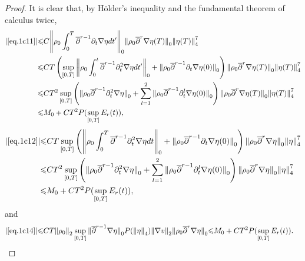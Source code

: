 \documentclass[12pt,twoside,reqno]{amsart}
\numberwithin{equation}{section}
\theoremstyle{definition}
\theoremstyle{remark}
\begin{document}
\begin{proof}
It is clear that, by H\"older's inequality and the fundamental theorem of calculus twice,
\begin{align*}
 {\vert{\eqref{eq.1c11}}\vert}{\leqslant}& C {\left\Vert{{\rho_0}  \int_0^T{\overline{\partial}}^{r-1}{\partial}_t{\nabla}\eta dt'}\right\Vert}_0{\Vert{{\rho_0}  {\overline{\partial}}^r{\nabla}\eta(T)}\Vert}_0{\Vert{\eta(T)}\Vert}_4^7\\
  {\leqslant} & CT\left(\sup_{[0,T]}{\left\Vert{{\rho_0} \int_0^t{\overline{\partial}}^{r-1}{\partial}_t^2{\nabla}\eta dt'}\right\Vert}_0+{\Vert{{\rho_0} {\overline{\partial}}^{r-1}{\partial}_t{\nabla}\eta(0)}\Vert}_0\right){\Vert{{\rho_0}   {\overline{\partial}}^r{\nabla}\eta(T)}\Vert}_0{\Vert{\eta(T)}\Vert}_4^7\\
  {\leqslant} & C T^2\sup_{[0,T]}\left({\Vert{{\rho_0}  {\overline{\partial}}^{r-1}{\partial}_t^2{\nabla}\eta }\Vert}_0+\sum_{l=1}^2{\Vert{{\rho_0}  {\overline{\partial}}^{r-1}{\partial}_t^l{\nabla}\eta(0)}\Vert}_0\right) {\Vert{{\rho_0} {\overline{\partial}}^r{\nabla}\eta(T)}\Vert}_0 {\Vert{\eta(T)}\Vert}_4^7\\
  {\leqslant}& M_0+ CT^2P(\sup_{[0,T]}E_r(t)),
\end{align*}
\begin{align*}
  {\vert{\eqref{eq.1c12}}\vert}{\leqslant} & CT\sup_{[0,T]}\left({\left\Vert{{\rho_0}  \int_0^T{\overline{\partial}}^{r-1}{\partial}_t^2{\nabla}\eta dt}\right\Vert}_0+{\Vert{{\rho_0}  {\overline{\partial}}^{r-1}{\partial}_t{\nabla}\eta(0)}\Vert}_0\right){\Vert{{\rho_0}  {\overline{\partial}}^r{\nabla}\eta}\Vert}_0 {\Vert{\eta}\Vert}_4^7\\
  {\leqslant} &CT^2\sup_{[0,T]}\left({\Vert{{\rho_0}  {\overline{\partial}}^{r-1}{\partial}_t^2{\nabla}\eta }\Vert}_0+\sum_{l=1}^2{\Vert{{\rho_0}  {\overline{\partial}}^{r-1}{\partial}_t^l{\nabla}\eta(0)}\Vert}_0\right){\Vert{{\rho_0}  {\overline{\partial}}^r{\nabla}\eta}\Vert}_0 {\Vert{\eta}\Vert}_4^7\\
  {\leqslant} &M_0+CT^2P(\sup_{[0,T]}E_r(t)),
\end{align*}
and
\begin{align*}
  {\vert{\eqref{eq.1c14}}\vert}{\leqslant} & CT{\Vert{\rho_0}\Vert}_2 \sup_{[0,T]}{\Vert{{\overline{\partial}}^{r-1}{\nabla}\eta}\Vert}_0P({\Vert{\eta}\Vert}_4){\Vert{{\nabla} v}\Vert}_2{\Vert{{\rho_0}  {\overline{\partial}}^r{\nabla}\eta}\Vert}_0
  {\leqslant} M_0+CT^2P(\sup_{[0,T]}E_r(t)).
\end{align*}


\end{proof}
\end{document}
